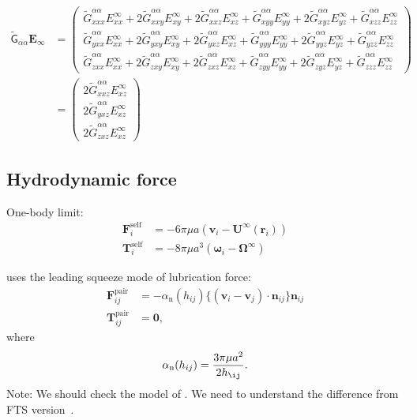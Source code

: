 \documentclass[12pt]{article}
\newcommand{\tens}[1]{\bm{\mathsf{#1}}}
\begin{document}
\begin{align}
 \tilde{\tens{G}}_{\alpha\alpha} \bm{E}_{\infty}
&= 
\begin{pmatrix}
 \tilde{G}^{\alpha\alpha}_{x xx} E_{xx}^{\infty}
+ 2\tilde{G}^{\alpha\alpha}_{x xy} E_{xy}^{\infty}
+ 2\tilde{G}^{\alpha\alpha}_{x xz} E_{xz}^{\infty}
+  \tilde{G}^{\alpha\alpha}_{x yy} E_{yy}^{\infty}
+ 2\tilde{G}^{\alpha\alpha}_{x yz} E_{yz}^{\infty}
+  \tilde{G}^{\alpha\alpha}_{x zz} E_{zz}^{\infty} 
\\
\tilde{G}^{\alpha\alpha}_{y xx} E_{xx}^{\infty}
+ 2\tilde{G}^{\alpha\alpha}_{y xy} E_{xy}^{\infty}
+ 2\tilde{G}^{\alpha\alpha}_{y xz} E_{xz}^{\infty}
+  \tilde{G}^{\alpha\alpha}_{y yy} E_{yy}^{\infty}
+ 2\tilde{G}^{\alpha\alpha}_{y yz} E_{yz}^{\infty}
+  \tilde{G}^{\alpha\alpha}_{y zz} E_{zz}^{\infty} 
\\
 \tilde{G}^{\alpha\alpha}_{z xx} E_{xx}^{\infty}
+ 2\tilde{G}^{\alpha\alpha}_{z xy} E_{xy}^{\infty}
+ 2\tilde{G}^{\alpha\alpha}_{z xz} E_{xz}^{\infty}
+  \tilde{G}^{\alpha\alpha}_{z yy} E_{yy}^{\infty}
+ 2\tilde{G}^{\alpha\alpha}_{z yz} E_{yz}^{\infty}
+  \tilde{G}^{\alpha\alpha}_{z zz} E_{zz}^{\infty} 
\end{pmatrix}
\\
&=
\begin{pmatrix}
 2\tilde{G}^{\alpha\alpha}_{x xz} E_{xz}^{\infty}
\\
 2\tilde{G}^{\alpha\alpha}_{y xz} E_{xz}^{\infty}
\\
 2\tilde{G}^{\alpha\alpha}_{z xz} E_{xz}^{\infty}
\end{pmatrix}
\end{align}

\newpage

\subsection*{Hydrodynamic force}

One-body limit:
\begin{align}
 \bm{F}_i^{\mathrm{self}} &= 
-6 \pi \mu a ( \bm{v}_i - \bm{U}^{\infty} (\bm{r}_i) ) \\
 \bm{T}_i^{\mathrm{self}} &= 
-8 \pi \mu a^3 ( \bm{\omega}_i - \bm{\Omega}^{\infty})
\end{align}

\citet{Melrose_2004a} uses 
the leading squeeze mode of lubrication force:
\begin{align}
 \bm{F}_{ij}^{\mathrm{pair}}
&=
- \alpha_{\mathrm{n}}(h_{ij})
\bigl\{
(\bm{v}_i - \bm{v}_j)
\cdot \bm{n}_{ij}
\bigr\}
\bm{n}_{ij} \\
 \bm{T}_{ij}^{\mathrm{pair}}
&=
\bm{0},
\end{align}
where
\begin{equation}
 \alpha_{\mathrm{n}}(h_{ij}) = 
\frac{3 \pi \mu a^2}{2 h_{\ij}}.
\end{equation}
Note: We should check the model of \citet{Ball_1997,Melrose_2004a}.
%
We need to understand the difference from FTS version~\citet{Jeffrey_1992}.
\end{document}
